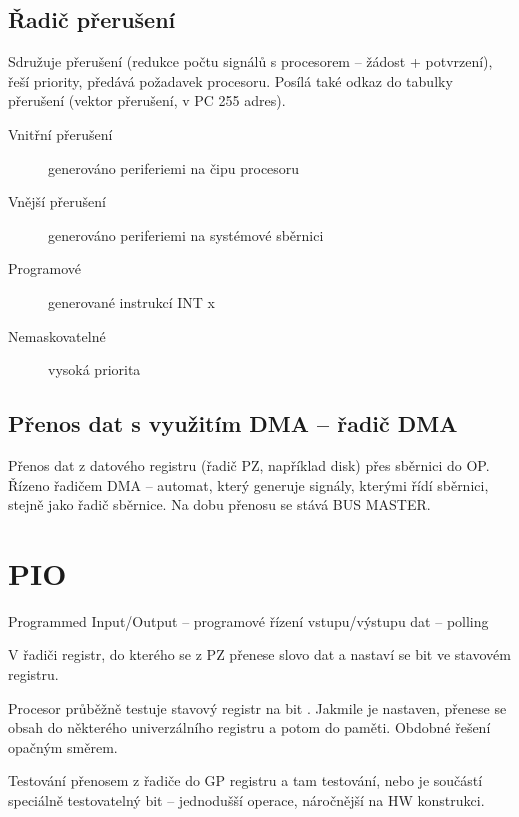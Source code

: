 \documentclass[a4wide]{report}
\begin{document}
\subsection{Řadič přerušení}

Sdružuje přerušení (redukce počtu signálů s procesorem -- žádost + potvrzení), řeší priority, předává požadavek procesoru. Posílá také odkaz do tabulky přerušení (vektor přerušení, v PC 255 adres).

\begin{description}
	\item[Vnitřní přerušení] generováno periferiemi na čipu procesoru
	\item[Vnější přerušení] generováno periferiemi na systémové sběrnici
	\item[Programové] generované instrukcí INT x
	\item[Nemaskovatelné] vysoká priorita
\end{description}

\subsection{Přenos dat s využitím DMA -- řadič DMA}
Přenos dat z datového registru (řadič PZ, například disk) přes sběrnici do OP. Řízeno řadičem DMA -- automat, který generuje signály, kterými řídí sběrnici, stejně jako řadič sběrnice. Na dobu přenosu se stává BUS MASTER.

\section{PIO}
Programmed Input/Output -- programové řízení vstupu/výstupu dat -- polling

V řadiči registr, do kterého se z PZ přenese slovo dat a nastaví se bit  ve stavovém registru.

Procesor průběžně testuje stavový registr na bit . Jakmile je nastaven, přenese se obsah do některého univerzálního registru a potom do paměti. Obdobné řešení opačným směrem.

Testování přenosem z řadiče do GP registru a tam testování, nebo je součástí speciálně testovatelný bit -- jednodušší operace, náročnější na HW konstrukci.
\end{document}
